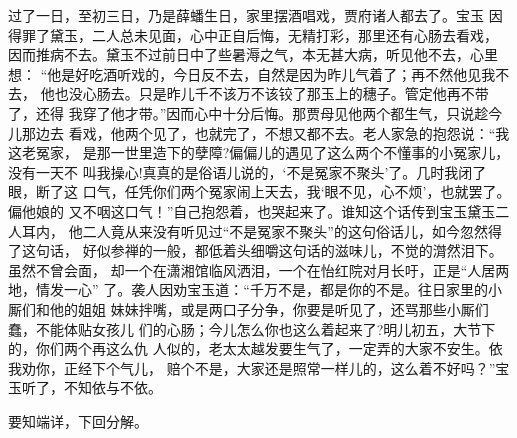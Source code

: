 过了一日，至初三日，乃是薛蟠生日，家里摆酒唱戏，贾府诸人都去了。宝玉
因得罪了黛玉，二人总未见面，心中正自后悔，无精打彩，那里还有心肠去看戏，
因而推病不去。黛玉不过前日中了些暑溽之气，本无甚大病，听见他不去，心里想：
“他是好吃酒听戏的，今日反不去，自然是因为昨儿气着了；再不然他见我不去，
他也没心肠去。只是昨儿千不该万不该铰了那玉上的穗子。管定他再不带了，还得
我穿了他才带。”因而心中十分后悔。那贾母见他两个都生气，只说趁今儿那边去
看戏，他两个见了，也就完了，不想又都不去。老人家急的抱怨说：“我这老冤家，
是那一世里造下的孽障?偏偏儿的遇见了这么两个不懂事的小冤家儿，没有一天不
叫我操心!真真的是俗语儿说的，‘不是冤家不聚头’了。几时我闭了眼，断了这
口气，任凭你们两个冤家闹上天去，我‘眼不见，心不烦’，也就罢了。偏他娘的
又不咽这口气！”自己抱怨着，也哭起来了。谁知这个话传到宝玉黛玉二人耳内，
他二人竟从来没有听见过“不是冤家不聚头”的这句俗话儿，如今忽然得了这句话，
好似参禅的一般，都低着头细嚼这句话的滋味儿，不觉的潸然泪下。虽然不曾会面，
却一个在潇湘馆临风洒泪，一个在怡红院对月长吁，正是“人居两地，情发一心”
了。袭人因劝宝玉道：“千万不是，都是你的不是。往日家里的小厮们和他的姐姐
妹妹拌嘴，或是两口子分争，你要是听见了，还骂那些小厮们蠢，不能体贴女孩儿
们的心肠；今儿怎么你也这么着起来了?明儿初五，大节下的，你们两个再这么仇
人似的，老太太越发要生气了，一定弄的大家不安生。依我劝你，正经下个气儿，
赔个不是，大家还是照常一样儿的，这么着不好吗？”宝玉听了，不知依与不依。

要知端详，下回分解。